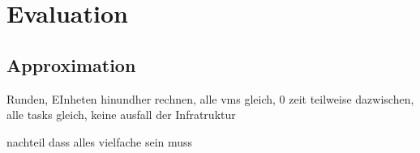 \chapter{Evaluation}
\label{ch:Evaluation}


\section{Approximation}
Runden, EInheten hinundher rechnen, alle vms gleich, 0 zeit teilweise dazwischen, alle tasks gleich, keine ausfall der Infratruktur

nachteil dass alles vielfache sein muss